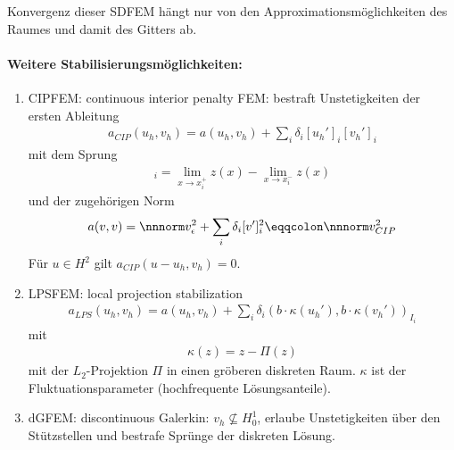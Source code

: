 Konvergenz dieser SDFEM hängt nur von den Approximationsmöglichkeiten des Raumes und damit des Gitters ab. 
\paragraph{Weitere Stabilisierungsmöglichkeiten:}
\label{sec:weit-stabili}
\begin{enumerate}
\item CIPFEM: continuous interior penalty FEM: bestraft Unstetigkeiten der ersten Ableitung
  \begin{align*}
    a_{CIP}(u_{h}, v_{h}) =  a(u_{h}, v_{h}) + \sum_{i}\delta_{i}[u_{h}']_{i}[v_{h}']_{i}
  \end{align*}
  mit dem Sprung
  \begin{align*}
    [z]_{i} = \lim_{x \to x_{i}^{+}} z(x) - \lim_{x \to x_{i}^{-}} z(x)
  \end{align*}
  und der zugehörigen Norm
  \begin{align*}
    a(v, v) = \nnnorm v_{\epsilon}^{2} + \sum_{i} \delta_{i} [v']_{i}^{2} \eqqcolon \nnnorm v_{CIP}^{2}
  \end{align*}
  Für $u \in H^{2}$ gilt $a_{CIP}(u-u_{h}, v_{h}) = 0$. 
\item LPSFEM: local projection stabilization
  \begin{align*}
    a_{LPS}(u_{h}, v_{h}) = a(u_{h}, v_{h}) + \sum_{i} \delta_{i}(b\cdot \kappa(u_{h}'), b\cdot \kappa(v_{h}'))_{I_{i}}
  \end{align*}
  mit
  \begin{align*}
    \kappa(z) = z - \Pi(z)
  \end{align*}
  mit der $L_{2}$-Projektion $\Pi$ in einen gröberen diskreten Raum. $\kappa$ ist der Fluktuationsparameter (hochfrequente Lösungsanteile). 
\item dGFEM: discontinuous Galerkin: $v_{h} \not \subseteq H_{0}^{1}$, erlaube Unstetigkeiten über den Stützstellen und bestrafe Sprünge der diskreten Lösung.
\end{enumerate}
